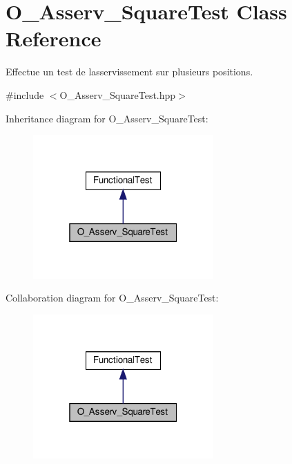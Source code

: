 \hypertarget{classO__Asserv__SquareTest}{}\section{O\+\_\+\+Asserv\+\_\+\+Square\+Test Class Reference}
\label{classO__Asserv__SquareTest}


Effectue un test de l\textquotesingle{}asservissement sur plusieurs positions.  




{\ttfamily \#include $<$O\+\_\+\+Asserv\+\_\+\+Square\+Test.\+hpp$>$}



Inheritance diagram for O\+\_\+\+Asserv\+\_\+\+Square\+Test\+:
\nopagebreak
\begin{figure}[H]
\begin{center}
\leavevmode
\includegraphics[width=196pt]{classO__Asserv__SquareTest__inherit__graph}
\end{center}
\end{figure}


Collaboration diagram for O\+\_\+\+Asserv\+\_\+\+Square\+Test\+:
\nopagebreak
\begin{figure}[H]
\begin{center}
\leavevmode
\includegraphics[width=196pt]{classO__Asserv__SquareTest__coll__graph}
\end{center}
\end{figure}
